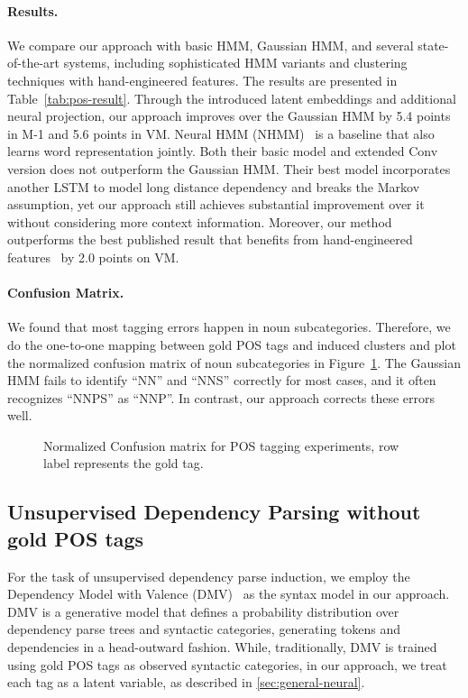 \documentclass[11pt,a4paper]{article}
\begin{document}
\paragraph{Results. }
We compare our approach with basic HMM, Gaussian HMM, and several state-of-the-art systems,
including sophisticated HMM variants and clustering techniques with hand-engineered features. The results are presented in Table~\ref{tab:pos-result}. Through the introduced latent embeddings and additional neural projection, our approach improves over the Gaussian HMM by 5.4 points in M-1 and 5.6 points in VM. Neural HMM (NHMM)~\citep{tran2016unsupervised} is a baseline that also learns word representation jointly. Both their basic model and extended Conv version does not outperform the Gaussian HMM. Their best model incorporates another LSTM to model long distance dependency and breaks the Markov assumption, yet our approach still achieves substantial improvement over it without considering more context information. Moreover, our method outperforms the best published result that benefits from hand-engineered features~\citep{yatbaz2012learning} by 2.0 points on VM.   

 \paragraph{Confusion Matrix. }
We found that most tagging errors happen in noun subcategories. Therefore, we do the one-to-one mapping between gold POS tags and induced clusters and plot the normalized confusion matrix of noun subcategories in Figure~\ref{fig:cm}. The Gaussian HMM fails to identify ``NN'' and ``NNS'' correctly for most cases, and it often recognizes ``NNPS'' as ``NNP''. In contrast, our approach corrects these errors well.
 \begin{figure}[!t]
 \begin{center}
 \hfil
 \vspace{-3mm}
 \caption{Normalized Confusion matrix for POS tagging experiments, row label represents the gold tag.}
  \vspace{-5mm}
 \label{fig:cm}
 \end{center}
 \end{figure}

\subsection{Unsupervised Dependency Parsing without gold POS tags}
For the task of unsupervised dependency parse induction, we employ the Dependency Model with Valence (DMV)~\citep{klein2004corpus} as the syntax model in our approach. DMV is a generative model that defines a probability distribution over dependency parse trees and syntactic categories, generating tokens and dependencies in a head-outward fashion. 
While, traditionally, DMV is trained using gold POS tags as observed syntactic categories, in our approach, we treat each tag as a latent variable, as described in \cref{sec:general-neural}. 
\end{document}

